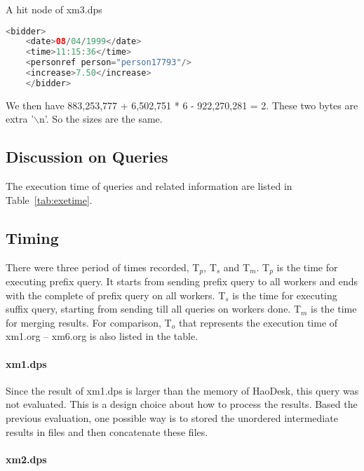 \begin{table}
	\centering
	\caption{A hit node of xm3.dps}
	\label{tab:bidder}
	\footnotesize
	\begin{lstlisting}[language=java,frame=single]
	<bidder>
	<date>08/04/1999</date>
	<time>11:15:36</time>
	<personref person="person17793"/>
	<increase>7.50</increase>
	</bidder>
	\end{lstlisting}
\end{table}



We then have 883,253,777 + 6,502,751 * 6 - 922,270,281 = 2. These two bytes are
extra '$\backslash$n'. So the sizes are the same.



\subsection{Discussion on Queries}

The execution time of queries and related information are listed in
Table~\ref{tab:exetime}.

\subsection{Timing}

There were three period of times recorded, T$_p$, T$_s$ and T$_m$. T$_p$ is the
time for executing prefix query. It starts from sending  prefix query to all
workers and ends with the complete of prefix query on all workers.
T$_s$ is the time for executing suffix query, starting from sending till all
queries on workers done. T$_m$ is the time for merging results.
For comparison, T$_o$ that represents the execution time of xm1.org -- xm6.org 
is also listed in the table.

\paragraph{xm1.dps}

Since the result of xm1.dps is larger than the memory of HaoDesk, this query was
not evaluated. This is a design  choice about how to process the results. Based
the previous evaluation, one possible way is to stored the unordered
intermediate results in files and then concatenate these files.

\paragraph{xm2.dps}

